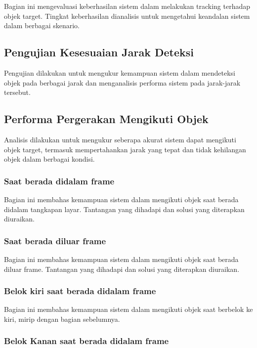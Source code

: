 Bagian ini mengevaluasi keberhasilan sistem dalam melakukan tracking terhadap objek target. Tingkat keberhasilan dianalisis untuk mengetahui keandalan sistem dalam berbagai skenario.

\subsection{Pengujian Kesesuaian Jarak Deteksi}
\label{subsec:pengujiankesesuaianjarakdeteksi}

Pengujian dilakukan untuk mengukur kemampuan sistem dalam mendeteksi objek pada berbagai jarak  dan menganalisis performa sistem pada jarak-jarak tersebut.

\subsection{Performa Pergerakan Mengikuti Objek}
\label{subsec:performaakurasiobjek}

Analisis dilakukan untuk mengukur seberapa akurat sistem dapat mengikuti objek target, termasuk mempertahankan jarak yang tepat dan tidak kehilangan objek dalam berbagai kondisi.

\subsubsection{Saat berada didalam frame}
\label{subsubsec:dalamframe}

Bagian ini membahas kemampuan sistem dalam mengikuti objek saat berada didalam tangkapan layar. Tantangan yang dihadapi dan solusi yang diterapkan diuraikan.

\subsubsection{Saat berada diluar frame}
\label{subsubsec:luarframe}

Bagian ini membahas kemampuan sistem dalam mengikuti objek saat berada diluar frame. Tantangan yang dihadapi dan solusi yang diterapkan diuraikan.

\subsubsection{Belok kiri saat berada didalam frame}
\label{subsubsec:belokkiri}

Bagian ini membahas kemampuan sistem dalam mengikuti objek saat berbelok ke kiri, mirip dengan bagian sebelumnya.

\subsubsection{Belok Kanan saat berada didalam frame}
\label{subsubsec:belokkanan}


